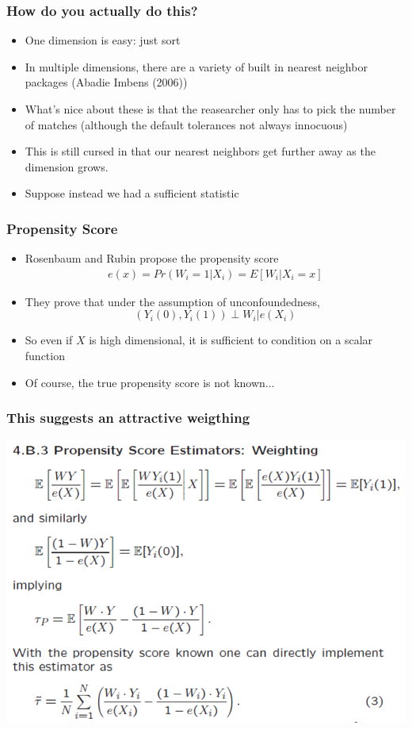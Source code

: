 \begin{frame}
\frametitle{How do you actually do this?}  
\begin{itemize}
  \item One dimension is easy: just sort 
  \item In multiple dimensions, there are a variety of built in nearest neighbor packages (Abadie Imbens (2006))
  \item What's nice about these is that the reasearcher only has to pick the number of matches (although the default tolerances not always innocuous)
  \item This is still cursed in that our nearest neighbors get further away as the dimension grows.
  \item Suppose instead we had a \alert{sufficient statistic}
\end{itemize}
\end{frame}

\begin{frame}
\frametitle{Propensity Score}
\begin{itemize}
\item Rosenbaum and Rubin propose the \alert{propensity score}
\begin{eqnarray*}
e(x) = Pr(W_i  = 1 | X_i) = E[W_i | X_i = x]
\end{eqnarray*}
\item They prove that under the assumption of unconfoundedness, 
  $$ (Y_i(0),Y_i(1)) \perp W_i | e(X_i) $$ 
\item So even if $X$ is high dimensional, it is sufficient to condition on a scalar function 
\item Of course, the true propensity score is not known... 
\end{itemize}
\end{frame}

\begin{frame}
  \frametitle{This suggests an attractive weigthing}
  \begin{center}
    \includegraphics[width=.9\textwidth]{./resources/imbensAEAPsWeight}
  \end{center}  
\end{frame}

